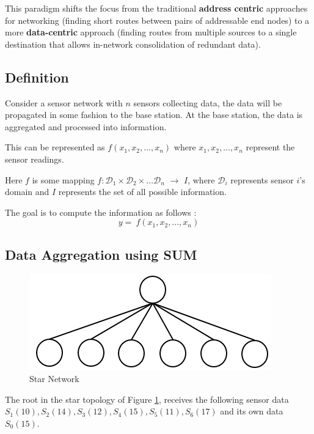 \documentclass[%
  slidesonly,%
  semlayer%
  ]{seminar}                                  %
\begin{document}
\begin{slide}
  This paradigm shifts the focus from the traditional \textbf{address centric} approaches for networking (finding short routes between pairs of addressable end nodes) to a more \textbf{data-centric} approach (finding routes from multiple sources to a single destination that allows in-network consolidation of redundant data).
  \clearpage

  \subsection*{Definition}
      Consider a sensor network with $n$ sensors collecting data, the data will be propagated in some fashion to the base station.
      At the base station, the data is aggregated and processed into information. 
      
      This can be represented as
        $f(x_{1}, x_{2},...,x_{n})$
      where $x_{1}, x_{2},..., x_{n}$ represent the sensor readings.
      
      Here $f$ is some mapping $f: \mathcal{D}_{1} \times \mathcal{D}_{2} \times ... \mathcal{D}_{n}$ $\rightarrow$ $I$, where $\mathcal{D}_{i}$ represents sensor $i$'s domain and $I$ represents the set of all possible information. 

      The goal is to compute the information as follows :
      \begin{equation*}
        y =\ f(x_{1}, x_{2},...,x_{n})
      \end{equation*}

      \clearpage

  \subsection*{Data Aggregation using SUM}
      
    \begin{figure}[h!]
      \centering
      \includegraphics[scale = 0.5]{images/star-tree.png}
      \caption{Star Network}
      \label{fig:star-network}
    \end{figure}

    The root in the star topology of Figure \ref{fig:star-network}, receives the following sensor data $S_{1}(10), S_{2}(14), S_{3}(12), S_{4}(15), S_{5}(11),S_{6}(17)$ and its own data $S_{0}(15)$. 


\end{slide}
\end{document}

